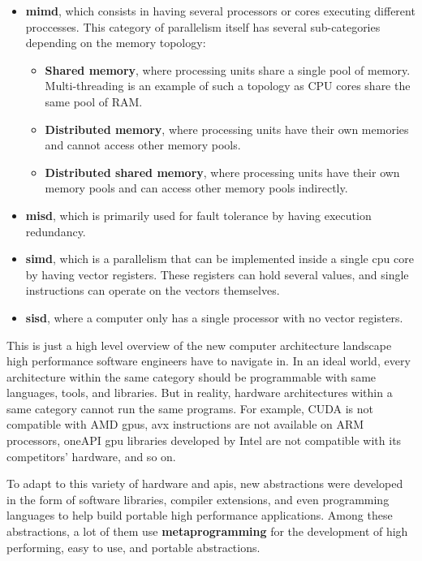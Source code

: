 \documentclass[main]{subfiles}
\begin{document}
\begin{itemize}
\item
\textbf{\gls{mimd}}, which consists in having several processors or cores
executing different proccesses. This category of parallelism itself has several
sub-categories depending on the memory topology:

  \begin{itemize}
  \item \textbf{Shared memory}, where processing units share a single
  pool of memory. Multi-threading is an example of such a topology as
  CPU cores share the same pool of RAM.
  \item \textbf{Distributed memory}, where processing units have their own
  memories and cannot access other memory pools.
  \item \textbf{Distributed shared memory}, where processing units have their
  own memory pools and can access other memory pools indirectly.
  \end{itemize}

\item
\textbf{\gls{misd}}, which is primarily used for fault tolerance by having
execution redundancy.

\item
\textbf{\gls{simd}}, which is a parallelism that can be implemented inside
a single \gls{cpu} core by having vector registers. These registers can hold
several values, and single instructions can operate on the vectors themselves.

\item
\textbf{\gls{sisd}}, where a computer only has a single processor with no
vector registers.

\end{itemize}

This is just a high level overview of the new computer architecture landscape
high performance software engineers have to navigate in.
In an ideal world, every architecture within the same category
should be programmable with same languages, tools, and libraries.
But in reality, hardware architectures within a same category
cannot run the same programs.
For example, CUDA is not compatible with AMD \glspl{gpu}, \gls{avx} instructions
are not available on ARM processors, oneAPI \gls{gpu} libraries developed by
Intel are not compatible with its competitors' hardware, and so on.

To adapt to this variety of hardware and \glspl{api}, new abstractions
were developed in the form of software libraries, compiler extensions,
and even programming languages to help build portable high performance
applications.
Among these abstractions, a lot of them use \textbf{metaprogramming} for the
development of high performing, easy to use, and portable abstractions.
\end{document}

